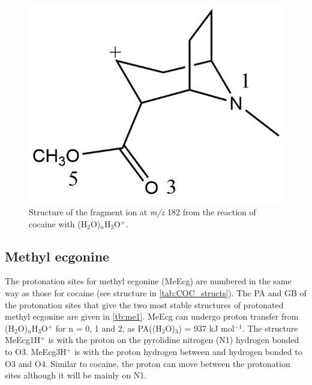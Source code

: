 \begin{figure}[htbp]
\centering
\includegraphics[width=0.25\linewidth]{pics/cocaine-chapter/coc_182.png}
\caption{Structure of the fragment ion at \textit{m/z} 182 from the reaction of cocaine with (H$_2$O)$_n$H$_3$O$^+$.}
\label{fig:coc_182}
\end{figure}






 
 

\subsection{Methyl ecgonine}

The protonation sites for methyl ecgonine (MeEcg) are numbered in the same way as those for cocaine (see structure in \autoref{tab:COC_structs}). 
%
The PA and GB of the protonation sites that give the two most stable structures of protonated methyl ecgonine are given in \autoref{tb:me1}.
%
MeEcg can undergo proton transfer from (H$_2$O)$_n$H$_3$O$^+$ for n = 0, 1 and 2, as PA((H$_2$O)$_3$) = 937 kJ mol$^{-1}$.
%
The structure MeEcg1H$^+$ is with the proton on the pyrolidine nitrogen (N1) hydrogen bonded to O3. 
%
MeEcg3H$^+$ is with the proton hydrogen between and hydrogen bonded to O3 and O4.
%
Similar to cocaine, the proton can move between the protonation sites although it will be mainly  on N1. 
%


